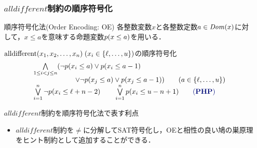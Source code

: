 \documentclass [dvipdfmx,11pt]{beamer}
\newcommand{\alldifferent}{$alldifferent$}
\begin{document}
\begin{frame}
    \frametitle{{\alldifferent}制約の順序符号化}
    \begin{block}{順序符号化法(Order Encoding: OE)}
        各整数変数$x$と各整数定数$a \in {\it Dom}(x)$に対して，$x \le a$を意味する命題変数\alert{\bf $p(x\le a)$}を用いる．
    \end{block}
    \begin{exampleblock}{{$\textrm{alldifferent}(x_1,x_2,\ldots,x_n) \; (x_i \in \{\ell,\dots,u\})$}の順序符号化}
        \begin{displaymath}
            \begin{array}{l}
            \bigwedge\limits_{1 \leq i < j \leq n} (\lnot \oE{x_i}{a} \lor \oE{x_i}{a-1} \\
            \qquad \qquad \qquad \lor \lnot \oE{x_j}{a} \lor \oE{x_j}{a-1})  \qquad (a \in \{\ell,\ldots, u\}) \\
            \bigvee\limits_{i=1}^{n} \lnot \oE{x_i}{\ell+n-2} \qquad \bigvee\limits_{i=1}^{n} \oE{x_i}{u-n+1} \qquad {\color[HTML]{000C79} \bf (PHP)}
            \end{array}
        \end{displaymath}
    \end{exampleblock}
    \begin{alertblock}{{\alldifferent}制約を順序符号化法で表す利点}
        \begin{itemize}
            \item {\alldifferent}制約を$\neq$に分解してSAT符号化し，OEと相性の良い鳩の巣原理をヒント制約として追加することができる．
        \end{itemize}
    \end{alertblock}
\end{frame}
\end{document}

